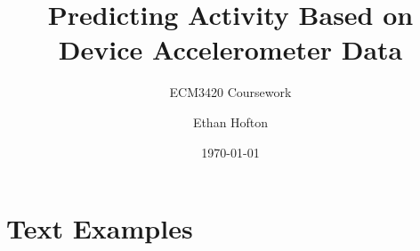 \documentclass[
	11pt, %
]{beamer}
\title[ECM3420 CA]{Predicting Activity Based on Device Accelerometer Data} %
\subtitle{ECM3420 Coursework} %
\author[Ethan Hofton]{Ethan Hofton} %
\institute[UofE]{University of Exeter \\ \smallskip \textit{eh736@exeter.ac.uk}} %
\date[\today]{\today} %
\begin{document}

\begin{frame}
	\titlepage %
\end{frame}



	


\section{Text Examples} %
\end{document}
